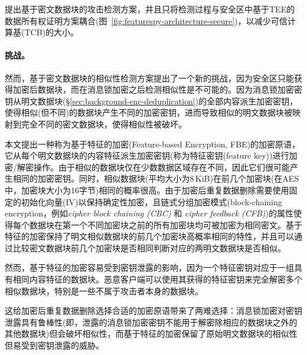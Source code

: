 \sysnameF 提出基于密文数据块的攻击检测方案，并且只将检测过程与安全区中基于TEE的数据所有权证明方案耦合(图~\ref{fig:featurespy-architecture-secure})，以减少可信计算基(TCB)的大小。

\paragraph*{挑战。}
然而，基于密文数据块的相似性检测方案提出了一个新的挑战，因为安全区只能获得加密后数据块，而在消息锁加密之后检测相似性是不可能的。因为消息锁加密密钥从明文数据块(\S\ref{sec:background-enc-deduplication})的全部内容派生加密密钥，使得相似(但不同)的数据块产生不同的加密密钥，进而导致相似的明文数据块被映射到完全不同的密文数据块，使得相似性被破坏。

本文提出一种称为基于特征的加密(Feature-based Encryption, FBE)的加密原语，它从每个明文数据块的内容特征派生加密密钥(称为特征密钥(feature key))进行加密/解密操作。由于相似的数据块仅在少数数据区域存在不同，因此它们很可能产生相同的加密密钥。同时，相似数据块(平均大小为8\,KiB)在前几个加密块(在AES中，加密块大小为16字节)相同的概率很高。由于加密后重复数据删除\cite{douceur2002reclaiming, shah15}需要使用固定的初始化向量(IV)以保持确定性加密，且链式分组加密模式(block-chaining encryption，例如{\em cipher block chaining (CBC)} 和 {\em cipher feedback (CFB)}\cite{dworkin01})的属性使得每个数据块在第一个不同加密块之前的所有加密块均可被加密为相同密文。基于特征的加密保持了明文相似数据块的前几个加密块高概率相同的特性，并且可以通过比较密文数据块前几个加密块是否相同判断对应的两明文数据块是否相似。

然而，基于特征的加密容易受到密钥泄露的影响，因为一个特征密钥对应于一组具有相同内容特征的数据块。恶意客户端可以使用其获得的特征密钥来完全解密多个相似数据块，特别是一些不属于攻击者本身的数据块。

这给加密后重复数据删除选择合适的加密原语带来了两难选择：消息锁加密对密钥泄露具有鲁棒性(即，泄露的消息锁加密密钥不能用于解密除相应的数据块之外的其他数据块)但会破坏相似性，而基于特征的加密保留了原始明文数据块的相似性但易受到密钥泄露的威胁。
